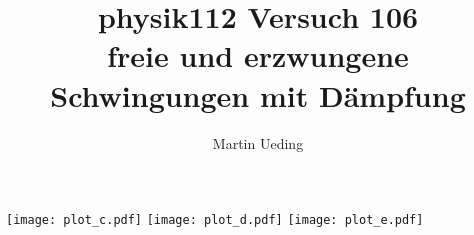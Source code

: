 \documentclass[11pt]{article}
\title{physik112 Versuch 106 \\ freie und erzwungene Schwingungen mit Dämpfung}
\author{Martin Ueding}
\begin{document}
\texttt{[image: plot\_c.pdf]}
\texttt{[image: plot\_d.pdf]}
\texttt{[image: plot\_e.pdf]}
\end{document}
